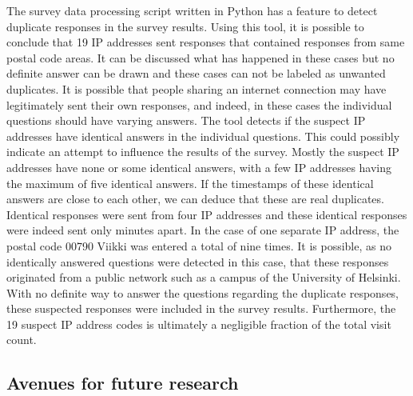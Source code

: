 The survey data processing script written in Python has a feature to detect duplicate responses in the survey results. Using this tool, it is possible to conclude that 19 IP addresses sent responses that contained responses from same postal code areas. It can be discussed what has happened in these cases but no definite answer can be drawn and these cases can not be labeled as unwanted duplicates. It is possible that people sharing an internet connection may have legitimately sent their own responses, and indeed, in these cases the individual questions should have varying answers. The tool detects if the suspect IP addresses have identical answers in the individual questions. This could possibly indicate an attempt to influence the results of the survey. Mostly the suspect IP addresses have none or some identical answers, with a few IP addresses having the maximum of five identical answers. If the timestamps of these identical answers are close to each other, we can deduce that these are real duplicates. Identical responses were sent from four IP addresses and these identical responses were indeed sent only minutes apart. In the case of one separate IP address, the postal code 00790 Viikki was entered a total of nine times. It is possible, as no identically answered questions were detected in this case, that these responses originated from a public network such as a campus of the University of Helsinki. With no definite way to answer the questions regarding the duplicate responses, these suspected responses were included in the survey results. Furthermore, the 19 suspect IP address codes is ultimately a negligible fraction of the total visit count.

\newpage
\subsection{Avenues for future research}
\justify

